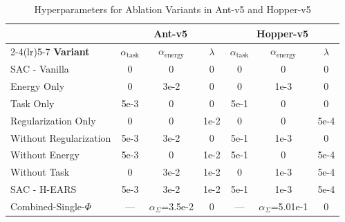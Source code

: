 \documentclass[journal]{IEEEtran}
\begin{document}
	\begin{table}[htbp]
		\renewcommand{\arraystretch}{1.3}
		\captionsetup{font=footnotesize, labelfont=footnotesize}
		\caption{Hyperparameters for Ablation Variants in Ant-v5 and Hopper-v5}
		\label{tab:ablation_config}
		\centering
		\footnotesize
		\begin{tabular}{lcccccc}
			\toprule
			& \multicolumn{3}{c}{\textbf{Ant-v5}} & \multicolumn{3}{c}{\textbf{Hopper-v5}} \\
			\cmidrule(lr){2-4}\cmidrule(lr){5-7}
			\textbf{Variant} & $\alpha_{\text{task}}$ & $\alpha_{\text{energy}}$ & $\lambda$ & $\alpha_{\text{task}}$ & $\alpha_{\text{energy}}$ & $\lambda$ \\
			\midrule
			SAC - Vanilla             & 0     & 0     & 0     & 0     & 0     & 0 \\
			Energy Only             & 0     & 3e-2  & 0     & 0     & 1e-3  & 0 \\
			Task Only               & 5e-3  & 0     & 0     & 5e-1  & 0     & 0 \\
			Regularization Only     & 0     & 0     & 1e-2  & 0     & 0     & 5e-4 \\
			Without Regularization  & 5e-3  & 3e-2  & 0     & 5e-1  & 1e-3  & 0 \\
			Without Energy          & 5e-3  & 0     & 1e-2  & 5e-1  & 0     & 5e-4 \\
			Without Task            & 0     & 3e-2  & 1e-2  & 0     & 1e-3  & 5e-4 \\
			SAC - H-EARS           & 5e-3  & 3e-2  & 1e-2  & 5e-1  & 1e-3  & 5e-4 \\
			\midrule
			Combined-Single-$\Phi$  & ---   & $\alpha_{\Sigma}$=3.5e-2 & 0 & --- & $\alpha_{\Sigma}$=5.01e-1 & 0 \\
			\bottomrule
		\end{tabular}
	\end{table}
	
\end{document}
